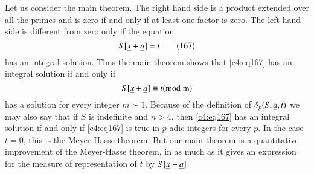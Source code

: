 Let us consider the main theorem. The right hand side is a product
extended over all the primes and is zero if and only if at least one
factor is zero. The left hand side is different from zero only if the
equation
\begin{equation*}
S[\underline{x}+\underline{a}]=t\tag{167}\label{c4:eq167}
\end{equation*}
has an integral solution. Thus the main theorem shows that \eqref{c4:eq167}
has an integral solution if and only if 
$$
S[\underline{x}+\underline{a}]\equiv t (\rm{mod} \; m)
$$\pageoriginale
has a solution for every integer $m \succ 1$. Because of the definition of
$\delta_{p}(S,\underline{a},t)$ we may also say that if $S$ is indefinite and
$n>4$, then \eqref{c4:eq167} has an integral solution if and only if
\eqref{c4:eq167} is true in $p$-adic integers for every $p$. In the case
$t=0$, this is the Meyer-Hasse theorem. But our main theorem is a
quantitative improvement of the Meyer-Hasse theorem, in as much as it
gives an expression for the measure of representation of $t$ by
$S[\underline{x}+\underline{a}]$. 

